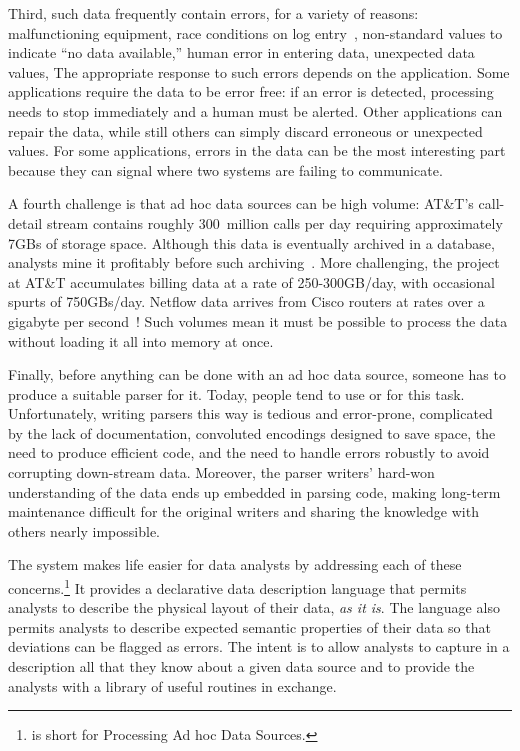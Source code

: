 \documentclass[11pt]{article}
\begin{document}
Third, such data frequently contain errors, for a variety of
reasons: malfunctioning equipment, race conditions on log
entry~\cite{wpp}, non-standard values to indicate ``no data
available,'' human error in entering data, unexpected data
values, \etc{} The appropriate response to such errors depends on the application. Some applications require the data to be error free: 
if an error is detected, processing needs to stop immediately and a human
must be alerted.  Other applications can repair the data, while still
others can simply discard erroneous or unexpected values.  
For some applications,
errors in the data can be the most interesting part  because
they can signal where two systems are failing to communicate.

A fourth challenge is that ad hoc data sources can be high volume:
AT\&T's call-detail stream contains roughly 300~million calls per day
requiring approximately 7GBs of storage space. Although this data is
eventually archived in a database, analysts mine it profitably before
such archiving~\cite{kdd98,kdd99}. More challenging, the \ningaui{} project at AT\&T
accumulates billing data at a rate
of 250-300GB/day, with occasional spurts of 750GBs/day. Netflow data
arrives from Cisco routers at rates over a gigabyte per
second~\cite{gigascope}! Such volumes mean it must be possible to
process the data without loading it all into memory at once.

Finally, before anything can be done with an ad hoc data source,
someone has to produce a suitable parser for it.
Today, people tend to use \C{} or \perl{} for this task.
Unfortunately, writing
parsers this way is tedious and error-prone, complicated by the lack
of documentation, convoluted encodings designed to save space, 
the need to produce efficient code,
and the need to handle errors robustly to avoid corrupting down-stream data.
Moreover, the parser writers' hard-won understanding of the data
ends up embedded in parsing code, making long-term maintenance
difficult for the original writers and sharing the knowledge with
others nearly impossible.

The \pads{} system makes life easier for data analysts by addressing
each of these concerns.\footnote{
  \pads{} is short for Processing Ad hoc Data Sources.
}
It provides a declarative data description
language that permits analysts to describe the physical layout of
their data, \textit{as it is}.  The language also permits analysts to
describe expected semantic properties of their data so that deviations can
be flagged as errors. The intent is to allow analysts to capture in a
\pads{} description all that they know about a given data source
and to provide the analysts with a library of useful routines in exchange. 
\end{document}
